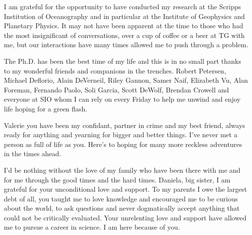 \begin{frontmatter}
\begin{acknowledgements}
I am grateful for the opportunity to have conducted my research at the Scripps Institution of Oceanography and in particular at the Institute of Geophysics and Planetary Physics. It may not have been apparent at the time to those who had the most insignificant of conversations, over a cup of coffee or a beer at TG with me, but our interactions have many times allowed me to push through a problem.

The Ph.D. has been the best time of my life and this is in no small part thanks to my wonderful friends and companions in the trenches. Robert Petersen, Michael Deflorio, Alain DeVerneil, Riley Gannon, Samer Naif, Elizabeth Vu, Alan Foreman, Fernando Paolo, Soli Garcia, Scott DeWolf, Brendan Crowell and everyone at SIO whom I can rely on every Friday to help me unwind and enjoy life hoping for a green flash.

Valerie you have been my confidant, partner in crime and my best friend, always ready for anything and yearning for bigger and better things. I've never met a person as full of life as you. Here's to hoping for many more reckless adventures in the times ahead.

I'd be nothing without the love of my family who have been there with me and for me through the good times and the hard times. Daniela, big sister, I am grateful for your unconditional love and support. To my parents I owe the largest debt of all, you taught me to love knowledge and encouraged me to be curious about the world, to ask questions and never dogmatically accept anything that could not be critically evaluated. Your unrelenting love and support have allowed me to pursue a career in science. I am here because of you.


\end{acknowledgements}
\end{frontmatter}
